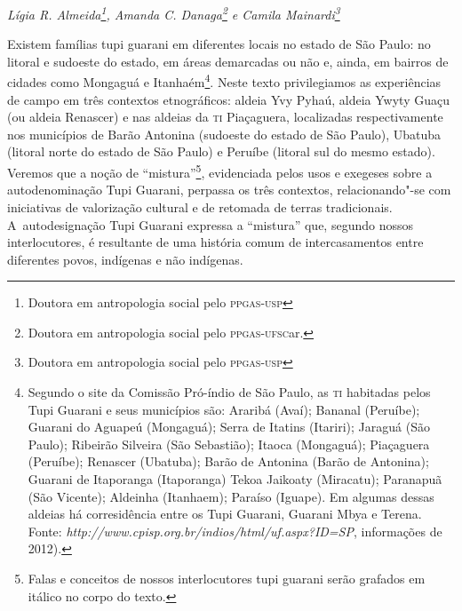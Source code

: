 
\begin{flushright}
\emph{Lígia R. Almeida\footnote{Doutora em antropologia social pelo
\textsc{ppgas}-\textsc{usp}}, Amanda C. Danaga\footnote{Doutora em antropologia
social pelo \textsc{ppgas}-\textsc{ufsc}ar.} e Camila Mainardi\footnote{Doutora em antropologia social pelo \textsc{ppgas}-\textsc{usp}}}
\end{flushright}
\medskip
%

\noindent
Existem famílias tupi guarani em diferentes locais no estado de São
Paulo: no litoral e sudoeste do estado, em áreas demarcadas ou não e,
ainda, em bairros de cidades como Mongaguá e Itanhaém\footnote{Segundo
o site da Comissão Pró-índio de São Paulo, as \textsc{ti} habitadas pelos Tupi
Guarani e seus municípios são: Araribá (Avaí); Bananal (Peruíbe);
Guarani do Aguapeú (Mongaguá); Serra de Itatins (Itariri); Jaraguá (São
Paulo); Ribeirão Silveira (São Sebastião); Itaoca (Mongaguá);
Piaçaguera (Peruíbe); Renascer (Ubatuba); Barão de Antonina (Barão de
Antonina); Guarani de Itaporanga (Itaporanga) Tekoa Jaikoaty
(Miracatu); Paranapuã (São Vicente); Aldeinha (Itanhaem); Paraíso
(Iguape). Em algumas dessas aldeias há corresidência entre os Tupi
Guarani, Guarani Mbya e Terena. Fonte: \emph{http://www.cpisp.org.br/indios/html/uf.aspx?ID=SP}, informações de
2012).}. Neste texto privilegiamos as experiências de campo em três
contextos etnográficos: aldeia Yvy Pyhaú, aldeia Ywyty Guaçu (ou aldeia
Renascer) e nas aldeias da \textsc{ti} Piaçaguera, localizadas respectivamente
nos municípios de Barão Antonina (sudoeste do estado de São Paulo),
Ubatuba (litoral norte do estado de São Paulo) e Peruíbe (litoral sul
do mesmo estado). Veremos que a noção de ``mistura''\footnote{Falas e
conceitos de nossos interlocutores tupi guarani serão grafados em
itálico no corpo do texto.}, evidenciada pelos usos e exegeses sobre a
autodenominação Tupi Guarani, perpassa os três contextos,
relacionando"-se com iniciativas de valorização cultural e de retomada
de terras tradicionais. A~autodesignação Tupi Guarani expressa a
``mistura'' que, segundo nossos interlocutores, é resultante de uma história
comum de intercasamentos entre diferentes povos, indígenas e não
indígenas. 

